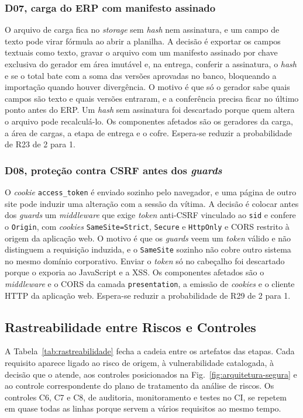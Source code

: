 \documentclass[conference]{IEEEtran}
\begin{document}
\subsubsection{D07, carga do ERP com manifesto assinado}
O arquivo de carga fica no \textit{storage} sem \textit{hash} nem assinatura, e um campo de texto pode virar fórmula ao abrir a planilha. A decisão é exportar os campos textuais como texto, gravar o arquivo com um manifesto assinado por chave exclusiva do gerador em área imutável e, na entrega, conferir a assinatura, o \textit{hash} e se o total bate com a soma das versões aprovadas no banco, bloqueando a importação quando houver divergência. O motivo é que só o gerador sabe quais campos são texto e quais versões entraram, e a conferência precisa ficar no último ponto antes do ERP. Um \textit{hash} sem assinatura foi descartado porque quem altera o arquivo pode recalculá-lo. Os componentes afetados são os geradores da carga, a área de cargas, a etapa de entrega e o cofre. Espera-se reduzir a probabilidade de R23 de 2 para 1.

\subsubsection{D08, proteção contra CSRF antes dos \textit{guards}}
O \textit{cookie} \texttt{access\_token} é enviado sozinho pelo navegador, e uma página de outro site pode induzir uma alteração com a sessão da vítima. A decisão é colocar antes dos \textit{guards} um \textit{middleware} que exige \textit{token} anti-CSRF vinculado ao \texttt{sid} e confere o \texttt{Origin}, com \textit{cookies} \texttt{SameSite=Strict}, \texttt{Secure} e \texttt{HttpOnly} e CORS restrito à origem da aplicação web. O motivo é que os \textit{guards} veem um \textit{token} válido e não distinguem a requisição induzida, e o \texttt{SameSite} sozinho não cobre outro sistema no mesmo domínio corporativo. Enviar o \textit{token} só no cabeçalho foi descartado porque o exporia ao JavaScript e a XSS. Os componentes afetados são o \textit{middleware} e o CORS da camada \texttt{presentation}, a emissão de \textit{cookies} e o cliente HTTP da aplicação web. Espera-se reduzir a probabilidade de R29 de 2 para 1.
\subsection{Rastreabilidade entre Riscos e Controles}
\label{subsec:rastreabilidade}

A Tabela~\ref{tab:rastreabilidade} fecha a cadeia entre os artefatos das etapas. Cada requisito aparece ligado ao risco de origem, à vulnerabilidade catalogada, à decisão que o atende, aos controles posicionados na Fig.~\ref{fig:arquitetura-segura} e ao controle correspondente do plano de tratamento da análise de riscos. Os controles C6, C7 e C8, de auditoria, monitoramento e testes no CI, se repetem em quase todas as linhas porque servem a vários requisitos ao mesmo tempo.
\end{document}
